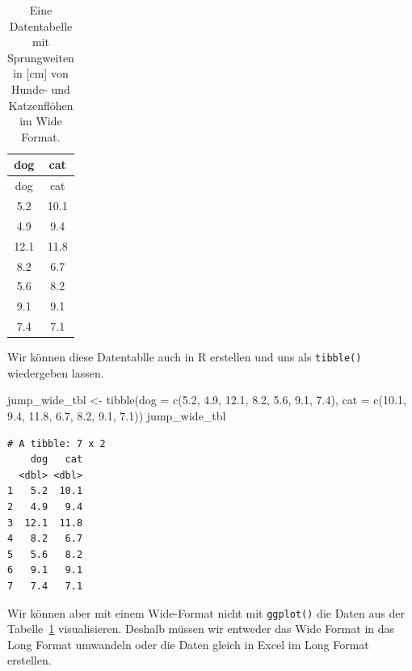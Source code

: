 \documentclass[
  letterpaper,
  DIV=11,
  oneside]{scrreport}
\newenvironment{Shaded}{\begin{snugshade}}{\end{snugshade}}
\newcommand{\AttributeTok}[1]{\textcolor[rgb]{0.40,0.45,0.13}{#1}}
\newcommand{\FloatTok}[1]{\textcolor[rgb]{0.68,0.00,0.00}{#1}}
\newcommand{\FunctionTok}[1]{\textcolor[rgb]{0.28,0.35,0.67}{#1}}
\newcommand{\NormalTok}[1]{\textcolor[rgb]{0.00,0.23,0.31}{#1}}
\newcommand{\OtherTok}[1]{\textcolor[rgb]{0.00,0.23,0.31}{#1}}
\begin{document}
\hypertarget{tbl-imp-cat-dog-wide}{}
\begin{longtable}[]{@{}cc@{}}
\caption{\label{tbl-imp-cat-dog-wide}Eine Datentabelle mit Sprungweiten
in {[}cm{]} von Hunde- und Katzenflöhen im Wide Format.}\tabularnewline
\toprule()
dog & cat \\
\midrule()
\endfirsthead
\toprule()
dog & cat \\
\midrule()
\endhead
5.2 & 10.1 \\
4.9 & 9.4 \\
12.1 & 11.8 \\
8.2 & 6.7 \\
5.6 & 8.2 \\
9.1 & 9.1 \\
7.4 & 7.1 \\
\bottomrule()
\end{longtable}

Wir können diese Datentablle auch in R erstellen und uns als
\texttt{tibble()} wiedergeben lassen.

\begin{Shaded}
\begin{Highlighting}[]
\NormalTok{jump\_wide\_tbl }\OtherTok{\textless{}{-}} \FunctionTok{tibble}\NormalTok{(}\AttributeTok{dog =} \FunctionTok{c}\NormalTok{(}\FloatTok{5.2}\NormalTok{, }\FloatTok{4.9}\NormalTok{, }\FloatTok{12.1}\NormalTok{, }\FloatTok{8.2}\NormalTok{, }\FloatTok{5.6}\NormalTok{, }\FloatTok{9.1}\NormalTok{, }\FloatTok{7.4}\NormalTok{),}
                        \AttributeTok{cat =} \FunctionTok{c}\NormalTok{(}\FloatTok{10.1}\NormalTok{, }\FloatTok{9.4}\NormalTok{, }\FloatTok{11.8}\NormalTok{, }\FloatTok{6.7}\NormalTok{, }\FloatTok{8.2}\NormalTok{, }\FloatTok{9.1}\NormalTok{, }\FloatTok{7.1}\NormalTok{))}
\NormalTok{jump\_wide\_tbl}
\end{Highlighting}
\end{Shaded}

\begin{verbatim}
# A tibble: 7 x 2
    dog   cat
  <dbl> <dbl>
1   5.2  10.1
2   4.9   9.4
3  12.1  11.8
4   8.2   6.7
5   5.6   8.2
6   9.1   9.1
7   7.4   7.1
\end{verbatim}

{}

Wir können aber mit einem Wide-Format nicht mit \texttt{ggplot()} die
Daten aus der Tabelle~\ref{tbl-imp-cat-dog-wide} visualisieren. Deshalb
müssen wir entweder das Wide Format in das Long Format umwandeln oder
die Daten gleich in Excel im Long Format erstellen.
\end{document}
